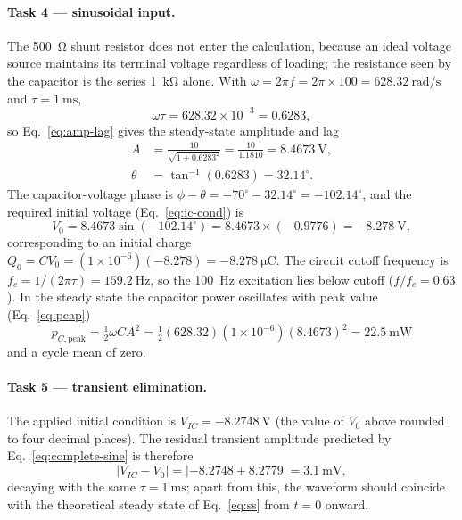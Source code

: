 \documentclass[12pt,a4paper]{article}
\begin{document}
	\paragraph{Task 4 --- sinusoidal input.}
	The \SI{500}{\ohm} shunt resistor does not enter the calculation,
	because an ideal voltage source maintains its terminal voltage
	regardless of loading; the resistance seen by the capacitor is the
	series \SI{1}{\kilo\ohm} alone.  With $\omega = 2\pi f = 2\pi \times
	100 = \SI{628.32}{\radian\per\second}$ and
	$\tau = \SI{1}{\milli\second}$,
	\begin{equation}
		\omega\tau = 628.32 \times 10^{-3} = 0.6283,
	\end{equation}
	so Eq.~\eqref{eq:amp-lag} gives the steady-state amplitude and lag
	\begin{align}
		A &= \frac{10}{\sqrt{1 + 0.6283^2}}
		= \frac{10}{1.1810} = \SI{8.4673}{\volt},\\
		\theta &= \tan^{-1}(0.6283) = 32.14^{\circ}.
	\end{align}
	The capacitor-voltage phase is $\phi - \theta = -70^\circ - 32.14^\circ
	= -102.14^\circ$, and the required initial voltage
	(Eq.~\eqref{eq:ic-cond}) is
	\begin{equation}
		V_0 = 8.4673\sin(-102.14^{\circ})
		= 8.4673 \times (-0.9776) = \SI{-8.278}{\volt},
	\end{equation}
	corresponding to an initial charge
	$Q_0 = C V_0 = (1\times10^{-6})(-8.278) =
	\SI{-8.278}{\micro\coulomb}$.  The circuit cutoff frequency is
	$f_c = 1/(2\pi\tau) = \SI{159.2}{\hertz}$, so the
	\SI{100}{\hertz} excitation lies below cutoff
	($f/f_c = 0.63$).  In the steady state the capacitor power
	oscillates with peak value (Eq.~\eqref{eq:pcap})
	\begin{equation}
		p_{C,\mathrm{peak}} = \tfrac{1}{2}\omega C A^{2}
		= \tfrac{1}{2}(628.32)\left(1\times10^{-6}\right)(8.4673)^2
		= \SI{22.5}{\milli\watt}
	\end{equation}
	and a cycle mean of zero.
	
	\paragraph{Task 5 --- transient elimination.}
	The applied initial condition is
	$V_{IC} = \SI{-8.2748}{\volt}$ (the value of $V_0$ above rounded to
	four decimal places).  The residual transient amplitude predicted by
	Eq.~\eqref{eq:complete-sine} is therefore
	\begin{equation}
		\left|V_{IC} - V_0\right| = \left|-8.2748 + 8.2779\right|
		= \SI{3.1}{\milli\volt},
	\end{equation}
	decaying with the same $\tau = \SI{1}{\milli\second}$; apart from
	this, the waveform should coincide with the theoretical steady state
	of Eq.~\eqref{eq:ss} from $t = 0$ onward.
	
\end{document}
